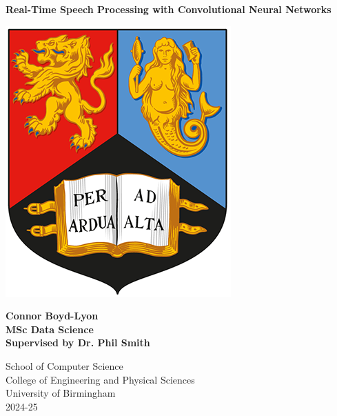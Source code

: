 
\thispagestyle{empty}

\begin{spacing}{2}
	\begin{center}
		\textbf{\Huge Real-Time Speech Processing with Convolutional Neural Networks}
	\end{center}
	\vspace{5mm}
	\begin{center}
		\includegraphics[scale = 1.75]{Preamble/BirmCrest.png}
	\end{center}
	\vspace{5mm}
	\begin{center}
		\textbf{\LARGE Connor Boyd-Lyon}
		\vspace{15mm}
		\\\textbf{\Large MSc Data Science}
		\\\textbf{\Large Supervised by Dr. Phil Smith}
		\vspace{20mm}
	\end{center}
	\begin{center}
		{\Large School of Computer Science}
		\\ {\Large College of Engineering and Physical Sciences}
		\\ {\Large University of Birmingham}
		\\ {\Large 2024-25}
	\end{center}
\end{spacing}


